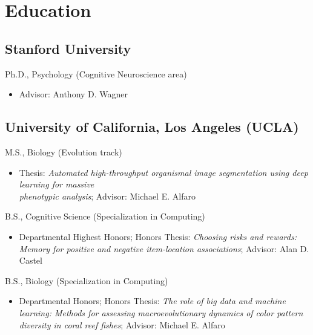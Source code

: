 \section*{Education}
\subsection*{\textbf{Stanford University}}
Ph.D., Psychology (Cognitive Neuroscience area)
\begin{itemize}[label={}, leftmargin=0.5cm, topsep=0.1cm]
    \item Advisor: Anthony D. Wagner
\end{itemize}

\subsection*{\textbf{University of California, Los Angeles (UCLA)}}
M.S., Biology (Evolution track)
\begin{itemize}[label={}, leftmargin=0.5cm, topsep=0.1cm]
    \item Thesis: \textit{Automated high-throughput organismal image segmentation using deep learning for massive\\ phenotypic analysis}; Advisor: Michael E. Alfaro
\end{itemize}

\medskip

B.S., Cognitive Science (Specialization in Computing)
\begin{itemize}[label={}, leftmargin=0.5cm, topsep=0.1cm]
    \item Departmental Highest Honors; Honors Thesis: \textit{Choosing risks and rewards: Memory for positive and negative item-location associations}; Advisor: Alan D. Castel
\end{itemize}

\medskip

B.S., Biology (Specialization in Computing)
\begin{itemize}[label={}, leftmargin=0.5cm, topsep=0.1cm]
    \item Departmental Honors; Honors Thesis: \textit{The role of big data and machine learning: Methods for assessing macroevolutionary dynamics of color pattern diversity in coral reef fishes}; Advisor: Michael E. Alfaro
\end{itemize}